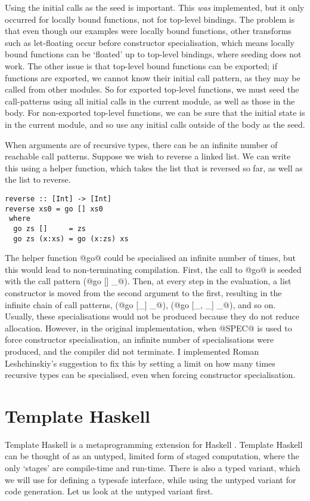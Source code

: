 Using the initial calls as the seed is important.
This \emph{was} implemented, but it only occurred for locally bound functions, not for top-level bindings.
The problem is that even though our examples were locally bound functions, other transforms such as let-floating occur before constructor specialisation, which means locally bound functions can be `floated' up to top-level bindings, where seeding does not work.
The other issue is that top-level bound functions can be exported; if functions are exported, we cannot know their initial call pattern, as they may be called from other modules.
So for exported top-level functions, we must seed the call-patterns using all initial calls in the current module, as well as those in the body.
For non-exported top-level functions, we can be sure that the initial state is in the current module, and so use any initial calls outside of the body as the seed.

When arguments are of recursive types, there can be an infinite number of reachable call patterns.
Suppose we wish to reverse a linked list.
We can write this using a helper function, which takes the list that is reversed so far, as well as the list to reverse.

\begin{lstlisting}
reverse :: [Int] -> [Int]
reverse xs0 = go [] xs0
 where
  go zs []     = zs
  go zs (x:xs) = go (x:zs) xs
\end{lstlisting}

The helper function @go@ could be specialised an infinite number of times, but this would lead to non-terminating compilation.
First, the call to @go@ is seeded with the call pattern (@go [] _@).
Then, at every step in the evaluation, a list constructor is moved from the second argument to the first, resulting in the infinite chain of call patterns, (@go [_] _@), (@go [_, _] _@), and so on.
Usually, these specialisations would not be produced because they do not reduce allocation.
However, in the original implementation, when @SPEC@ is used to force constructor specialisation, an infinite number of specialisations were produced, and the compiler did not terminate.
I implemented Roman Leshchinskiy's suggestion to fix this by setting a limit on how many times recursive types can be specialised, even when forcing constructor specialisation.


\section{Template Haskell}
Template Haskell is a metaprogramming extension for Haskell \cite{sheard2002template}.
Template Haskell can be thought of as an untyped, limited form of staged computation, where the only `stages' are compile-time and run-time.
There is also a typed variant, which we will use for defining a typesafe interface, while using the untyped variant for code generation.
Let us look at the untyped variant first.

